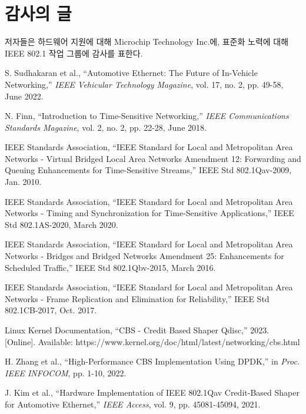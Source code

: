 \documentclass[twocolumn,10pt]{article}
\begin{document}
\section*{감사의 글}

저자들은 하드웨어 지원에 대해 Microchip Technology Inc.에, 표준화 노력에 대해 IEEE 802.1 작업 그룹에 감사를 표한다.

\begin{thebibliography}{99}

S. Sudhakaran et al., ``Automotive Ethernet: The Future of In-Vehicle Networking,'' \textit{IEEE Vehicular Technology Magazine}, vol. 17, no. 2, pp. 49-58, June 2022.

N. Finn, ``Introduction to Time-Sensitive Networking,'' \textit{IEEE Communications Standards Magazine}, vol. 2, no. 2, pp. 22-28, June 2018.

IEEE Standards Association, ``IEEE Standard for Local and Metropolitan Area Networks - Virtual Bridged Local Area Networks Amendment 12: Forwarding and Queuing Enhancements for Time-Sensitive Streams,'' IEEE Std 802.1Qav-2009, Jan. 2010.

IEEE Standards Association, ``IEEE Standard for Local and Metropolitan Area Networks - Timing and Synchronization for Time-Sensitive Applications,'' IEEE Std 802.1AS-2020, March 2020.

IEEE Standards Association, ``IEEE Standard for Local and Metropolitan Area Networks - Bridges and Bridged Networks Amendment 25: Enhancements for Scheduled Traffic,'' IEEE Std 802.1Qbv-2015, March 2016.

IEEE Standards Association, ``IEEE Standard for Local and Metropolitan Area Networks - Frame Replication and Elimination for Reliability,'' IEEE Std 802.1CB-2017, Oct. 2017.

Linux Kernel Documentation, ``CBS - Credit Based Shaper Qdisc,'' 2023. [Online]. Available: https://www.kernel.org/doc/html/latest/networking/cbs.html

H. Zhang et al., ``High-Performance CBS Implementation Using DPDK,'' in \textit{Proc. IEEE INFOCOM}, pp. 1-10, 2022.

J. Kim et al., ``Hardware Implementation of IEEE 802.1Qav Credit-Based Shaper for Automotive Ethernet,'' \textit{IEEE Access}, vol. 9, pp. 45081-45094, 2021.

\end{thebibliography}
\end{document}
